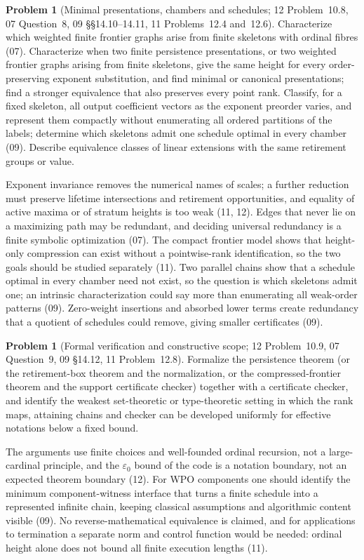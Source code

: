 \documentclass[11pt,a4paper]{article}
\theoremstyle{definition}
\newtheorem{problem}[theorem]{Problem}
\theoremstyle{remark}
\newcommand{\eps}{\varepsilon_0}
\begin{document}
\begin{problem}[Minimal presentations, chambers and schedules; 12 Problem~10.8, 07 Question~8, 09 \S\S14.10--14.11, 11 Problems~12.4 and~12.6]
\label{nh:prob:presentations}
Characterize which weighted finite frontier graphs arise from finite skeletons
with ordinal fibres (07). Characterize when two finite persistence presentations,
or two weighted frontier graphs arising from finite skeletons, give the same
height for every order-preserving exponent substitution, and find minimal or
canonical presentations; find a stronger equivalence that also preserves every
point rank. Classify, for a fixed skeleton, all output coefficient vectors as the
exponent preorder varies, and represent them compactly without enumerating all
ordered partitions of the labels; determine which skeletons admit one schedule
optimal in every chamber (09). Describe equivalence classes of linear extensions
with the same retirement groups or value.
\end{problem}
Exponent invariance removes the numerical names of scales; a further reduction must
preserve lifetime intersections and retirement opportunities, and equality of active
maxima or of stratum heights is too weak (11, 12). Edges that never lie on a
maximizing path may be redundant, and deciding universal redundancy is a finite
symbolic optimization (07). The compact frontier model shows that height-only
compression can exist without a pointwise-rank identification, so the two goals
should be studied separately (11). Two parallel chains show that a schedule optimal
in every chamber need not exist, so the question is which skeletons admit one; an
intrinsic characterization could say more than enumerating all weak-order
patterns (09). Zero-weight insertions and absorbed lower terms
create redundancy that a quotient of schedules could remove, giving smaller
certificates (09).

\begin{problem}[Formal verification and constructive scope; 12 Problem~10.9, 07 Question~9, 09 \S14.12, 11 Problem~12.8]
\label{nh:prob:formal}
Formalize the persistence theorem (or the retirement-box theorem and the
normalization, or the compressed-frontier theorem and the support certificate
checker) together with a certificate checker, and identify the weakest set-theoretic
or type-theoretic setting in which the rank maps, attaining chains and checker can be
developed uniformly for effective notations below a fixed bound.
\end{problem}
The arguments use finite choices and well-founded ordinal recursion, not a
large-cardinal principle, and the $\eps$ bound of the code is a notation boundary,
not an expected theorem boundary (12). For WPO components one should identify the
minimum component-witness interface that turns a finite schedule into a represented
infinite chain, keeping classical assumptions and algorithmic content visible (09).
No reverse-mathematical equivalence is claimed, and for applications to termination
a separate norm and control function would be needed: ordinal height alone does not
bound all finite execution lengths (11).
\end{document}
